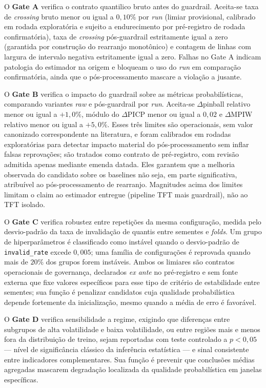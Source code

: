 O \textbf{Gate A} verifica o contrato quantilico bruto antes do guardrail. Aceita-se taxa de \textit{crossing} bruto menor ou igual a \(0{,}10\%\) por \textit{run} (limiar provisional, calibrado em rodada exploratória e sujeito a endurecimento por pré-registro de rodada confirmatória), taxa de \textit{crossing} pós-guardrail estritamente igual a zero (garantida por construção do rearranjo monotônico) e contagem de linhas com largura de intervalo negativa estritamente igual a zero. Falhas no Gate A indicam patologia do estimador na origem e bloqueam o uso do \textit{run} em comparação confirmatória, ainda que o pós-processamento mascare a violação a jusante.

O \textbf{Gate B} verifica o impacto do guardrail sobre as métricas probabilísticas, comparando variantes \textit{raw} e pós-guardrail por \textit{run}. Aceita-se \(\Delta\)pinball relativo menor ou igual a \(+1{,}0\%\), módulo do \(\Delta\)PICP menor ou igual a \(0{,}02\) e \(\Delta\)MPIW relativo menor ou igual a \(+5{,}0\%\). Esses três limites são operacionais, sem valor canonizado correspondente na literatura, e foram calibrados em rodadas exploratórias para detectar impacto material do pós-processamento sem inflar falsas reprovações; são tratados como contrato de pré-registro, com revisão admitida apenas mediante emenda datada. Eles garantem que a melhoria observada do candidato sobre os baselines não seja, em parte significativa, atribuível ao pós-processamento de rearranjo. Magnitudes acima dos limites limitam o claim ao estimador entregue (pipeline TFT mais guardrail), não ao TFT isolado.

O \textbf{Gate C} verifica robustez entre repetições da mesma configuração, medida pelo desvio-padrão da taxa de invalidação de quantis entre sementes e \textit{folds}. Um grupo de hiperparâmetros é classificado como instável quando o desvio-padrão de \texttt{invalid\_rate} excede \(0{,}005\); uma família de configurações é reprovada quando mais de \(20\%\) dos grupos forem instáveis. Ambos os limiares são contratos operacionais de governança, declarados \textit{ex ante} no pré-registro e sem fonte externa que fixe valores específicos para esse tipo de critério de estabilidade entre sementes; sua função é penalizar candidatos cuja qualidade probabilística depende fortemente da inicialização, mesmo quando a média de erro é favorável.

O \textbf{Gate D} verifica sensibilidade a regime, exigindo que diferenças entre subgrupos de alta volatilidade e baixa volatilidade, ou entre regiões mais e menos fora da distribuição de treino, sejam reportadas com teste controlado a \(p < 0{,}05\) — nível de significância clássico da inferência estatística — e sinal consistente entre indicadores complementares. Sua função é prevenir que conclusões médias agregadas mascarem degradação localizada da qualidade probabilística em janelas específicas.

